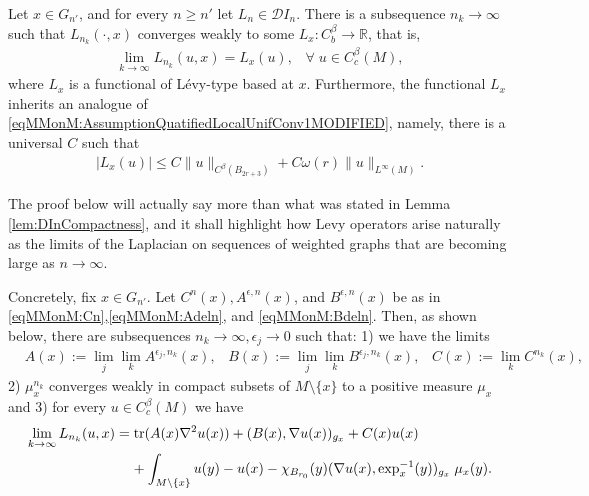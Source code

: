\documentclass[11pt,reqno]{amsart}
\numberwithin{equation}{section}
\theoremstyle{plain}
\def\D{\mathcal D}
\def\Tr{\textnormal{tr}}
\begin{document}
\begin{lem}\label{lem:DInCompactness}
  Let $x \in G_{n'}$, and for every $n\geq n'$ let $L_n \in \D I_n$.  There is a subsequence $n_k\to \infty$ such that $L_{n_k}(\cdot,x)$ converges weakly to some $L_x:C^\beta_b \to \mathbb{R}$, that is, 
  \begin{align*}
    \lim\limits_{k\to \infty} L_{n_k}(u,x) = L_x(u),\;\;\;\forall\;u\in C^\beta_c(M),
  \end{align*}
  where $L_x$ is a functional of L\'evy-type based at $x$. Furthermore, the functional $L_x$ inherits an analogue of \eqref{eqMMonM:AssumptionQuatifiedLocalUnifConv1MODIFIED}, namely, there is a universal $C$ such that
  \begin{align*}
    |L_x(u)| \leq C\|u\|_{C^\beta(B_{2r+3})}+C\omega(r)\|u\|_{L^\infty(M)}.    	  
  \end{align*}	  
\end{lem}

\begin{rem}
  The proof below will actually say more than what was stated in Lemma \ref{lem:DInCompactness}, and it shall highlight how Levy operators arise naturally as the limits of the Laplacian on sequences of weighted graphs that are becoming large as $n\to\infty$. 
  
  Concretely, fix $x\in G_{n'}$. Let $C^n(x), A^{\epsilon,n}(x)$, and $B^{\epsilon,n}(x)$ be as in \eqref{eqMMonM:Cn},\eqref{eqMMonM:Adeln}, and \eqref{eqMMonM:Bdeln}. Then, as shown below, there are subsequences $n_k \to \infty,\epsilon_j \to 0$ such that: 1) we have the limits
  \begin{align*}
    & A(x) := \lim\limits_{j}\lim\limits_{k}A^{\epsilon_j,n_k}(x),\;\;\; B(x) := \lim\limits_{j}\lim\limits_{k}B^{\epsilon_j,n_k}(x),\;\;\; C(x) := \lim\limits_{k}C^{n_k}(x),
  \end{align*}	  
  2) $\mu_{x}^{n_k}$ converges weakly in compact subsets of $M\setminus \{x\}$ to a positive measure $\mu_x$ and 3) for every $u \in C^\beta_c(M)$ we have
  \begin{align*}
    \lim\limits_{k\to \infty} L_{n_k}(u,x) & = \Tr(A(x) \nabla^2u(x))+(B(x),\nabla u(x))_{g_x}+C(x)u(x)\\
	  & \;\;\;\;+\int_{M\setminus \{x\} }u(y)-u(x)-\chi_{B_{r_0}}(y)(\nabla u(x),\exp_x^{-1}(y))_{g_x}\;\mu_x(y).	  
  \end{align*}	  
\end{rem}
\end{document}
